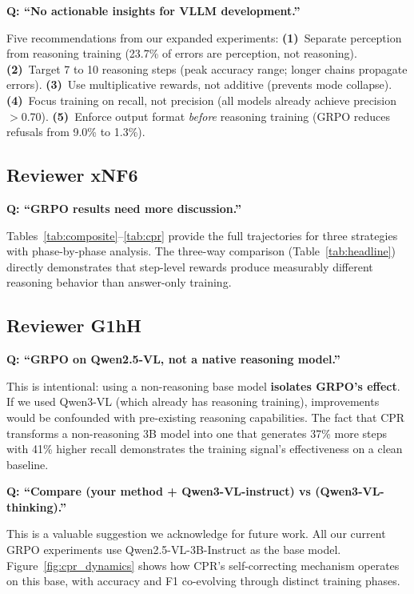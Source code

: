 \documentclass[10pt,twocolumn,letterpaper]{article}
\begin{document}
\noindent\textbf{Q: ``No actionable insights for VLLM development.''}

Five recommendations from our expanded experiments: \textbf{(1)}~Separate perception from reasoning training (23.7\% of errors are perception, not reasoning). \textbf{(2)}~Target 7 to 10 reasoning steps (peak accuracy range; longer chains propagate errors). \textbf{(3)}~Use multiplicative rewards, not additive (prevents mode collapse). \textbf{(4)}~Focus training on recall, not precision (all models already achieve precision~$>$0.70). \textbf{(5)}~Enforce output format \textit{before} reasoning training (GRPO reduces refusals from 9.0\% to 1.3\%).

\subsection{Reviewer xNF6}

\noindent\textbf{Q: ``GRPO results need more discussion.''}

Tables~\ref{tab:composite}--\ref{tab:cpr} provide the full trajectories for three strategies with phase-by-phase analysis. The three-way comparison (Table~\ref{tab:headline}) directly demonstrates that step-level rewards produce measurably different reasoning behavior than answer-only training.

\subsection{Reviewer G1hH}

\noindent\textbf{Q: ``GRPO on Qwen2.5-VL, not a native reasoning model.''}

This is intentional: using a non-reasoning base model \textbf{isolates GRPO's effect}. If we used Qwen3-VL (which already has reasoning training), improvements would be confounded with pre-existing reasoning capabilities. The fact that CPR transforms a non-reasoning 3B model into one that generates 37\% more steps with 41\% higher recall demonstrates the training signal's effectiveness on a clean baseline.

\noindent\textbf{Q: ``Compare (your method + Qwen3-VL-instruct) vs (Qwen3-VL-thinking).''}

This is a valuable suggestion we acknowledge for future work. All our current GRPO experiments use Qwen2.5-VL-3B-Instruct as the base model. Figure~\ref{fig:cpr_dynamics} shows how CPR's self-correcting mechanism operates on this base, with accuracy and F1 co-evolving through distinct training phases.
\end{document}
